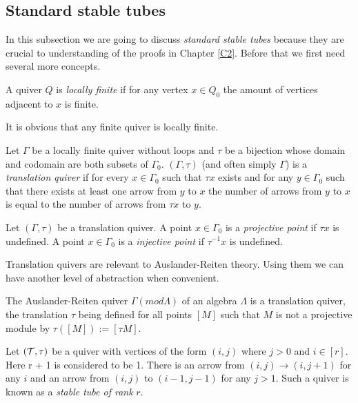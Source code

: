 \subsection{Standard stable tubes}
\indent In this subsection we are going to discuss \textit{standard stable tubes} because they are crucial to understanding of the proofs in Chapter \ref{C2}. Before that we first need several more concepts.\\
\begin{definition}
A quiver $Q$ is \textit{locally finite} if for any vertex $x\in Q_0$ the amount of vertices adjacent to $x$ is finite.
\end{definition}
\indent It is obvious that any finite quiver is locally finite.
\begin{definition}
\cite{ASS06} Let $\Gamma$ be a locally finite quiver without loops and $\tau$ be a bijection whose domain and codomain are both subsets of $\Gamma_0$. $(\Gamma,\tau)$ (and often simply $\Gamma$) is a \textit{translation quiver} if for every $x\in \Gamma_0$ such that $\tau x$ exists and for any $y\in\Gamma_0$ such that there exists at least one arrow from $y$ to $x$ the number of arrows from $y$ to $x$ is equal to the number of arrows from $\tau x$ to $y$.
\end{definition}
\begin{definition}
Let $(\Gamma, \tau)$ be a translation quiver. A point $x\in\Gamma_0$ is a \textit{projective point} if $\tau x$ is undefined. A point $x\in\Gamma_0$ is a \textit{injective point} if $\tau^{-1} x$ is undefined. 
\end{definition}
\indent Translation quivers are relevant to Auslander-Reiten theory. Using them we can have another level of abstraction when convenient.\\
\begin{lemma}
\cite{ASS06} The Auslander-Reiten quiver $\Gamma(mod \Lambda)$ of an algebra $\Lambda$ is a translation quiver, the translation $\tau$ being defined for all points $[M]$ such that $M$ is not a projective module by $\tau([M]):=[\tau M]$. 
\end{lemma}
\begin{definition}
\cite{SS06} Let $(\mathcal{T},\tau)$ be a quiver with vertices of the form $(i,j)$ where $j > 0$ and $i\in [r]$. Here r + 1 is considered to be 1. There is an arrow from $(i,j)\to (i, j + 1)$ for any $i$ and an arrow from $(i,j)$ to $(i - 1, j - 1)$ for any $j>1$. Such a quiver is known as a \textit{stable tube of rank} $r$.
\end{definition}
